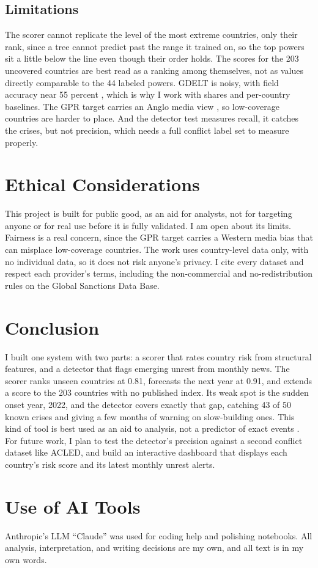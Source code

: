\documentclass[stu,12pt,floatsintext]{apa7}
\begin{document}
\subsection{Limitations}
The scorer cannot replicate the level of the most extreme countries, only their rank, since a tree cannot predict past the range it trained on, so the top powers sit a little below the line even though their order holds. The scores for the 203 uncovered countries are best read as a ranking among themselves, not as values directly comparable to the 44 labeled powers. GDELT is noisy, with field accuracy near 55 percent \cite{hong2025}, which is why I work with shares and per-country baselines. The GPR target carries an Anglo media view \cite{caldara2022}, so low-coverage countries are harder to place. And the detector test measures recall, it catches the crises, but not precision, which needs a full conflict label set to measure properly.

\section{Ethical Considerations}
This project is built for public good, as an aid for analysts, not for targeting anyone or for real use before it is fully validated. I am open about its limits. Fairness is a real concern, since the GPR target carries a Western media bias that can misplace low-coverage countries. The work uses country-level data only, with no individual data, so it does not risk anyone's privacy. I cite every dataset and respect each provider's terms, including the non-commercial and no-redistribution rules on the Global Sanctions Data Base.

\section{Conclusion}
I built one system with two parts: a scorer that rates country risk from structural features, and a detector that flags emerging unrest from monthly news. The scorer ranks unseen countries at 0.81, forecasts the next year at 0.91, and extends a score to the 203 countries with no published index. Its weak spot is the sudden onset year, 2022, and the detector covers exactly that gap, catching 43 of 50 known crises and giving a few months of warning on slow-building ones. This kind of tool is best used as an aid to analysis, not a predictor of exact events \cite{murphy2024}. For future work, I plan to test the detector's precision against a second conflict dataset like ACLED, and build an interactive dashboard that displays each country's risk score and its latest monthly unrest alerts.

\section{Use of AI Tools}
Anthropic's LLM \enquote{Claude} was used for coding help and polishing notebooks. All analysis, interpretation, and writing decisions are my own, and all text is in my own words.



\end{document}
